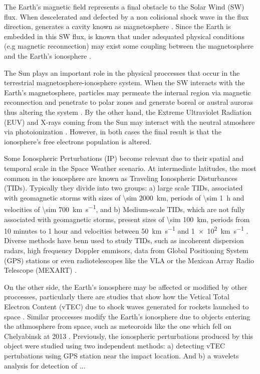 The Earth's magnetic field represents a final obstacle to the Solar Wind (SW) flux. When descelerated and defected by a non colisional shock wave in the flux direction, generates a cavity known as magnetosphere \citep{Blanco-Cano:2004}. Since the Earth is embedded in this SW flux, is known that under adequated physical conditions (e.g magnetic reconnection) may exist some coupling between the magnetosphere and the Earth's ionosphere \citep{Zolesi:2014, Cnossen:2014}.

The Sun plays an important role in the physical proccesses that occur in the terrestrial magnetosphere-ionosphere system. When the SW interacts with the Earth's magnetosphere, particles may permeate the internal region via magnetic reconnection and penetrate to polar zones and generate boreal or austral auroras thus altering the system \citep{Vazquez:2016, Oka:2011}. By the other hand, the Extreme Ultraviolet Radiation (EUV) and X-rays coming from the Sun may interact with the neutral atmoshere via photoionization \citep{Vlasov:2010}. However, in both cases the final result is that the ionosphere's free electrons population is altered.

Some Ionospheric Perturbations (IP) become relevant due to their spatial and temporal scale in the Space Weather scenario. At intermediate latitudes, the most common in the ionosphere are known as Traveling Ionospheric Disturbances (TIDs). Typically they divide into two groups: a) large scale TIDs, associated with geomagnetic storms with sizes of \SI{\sim 2000}{km}, periods of \SI{\sim 1}{h} and velocities of \SI{\sim 700}{km.s^{-1}}, and b) Medium-scale TIDs, which are not fully associated with geomagnetic storms, present sizes of \SI{\sim 100}{km}, periods from 10 minutes to 1 hour and velocities between \SI{50}{km.s^{-1}} and \SI{1e2}{km.s^{-1}} \citep{Helmboldt:2012}. Diverse methods have benn used to study TIDs, such as incoherent dispersion radars, high frequency Doppler emmisors, data from Global Positioning System (GPS) stations or even radiotelescopes like the VLA or the Mexican Array Radio Telescope (MEXART) \citep{Chilcote:2015, Rodriguez:2014}.

On the other side, the Earth's ionosphere may be affected or modified by other proccesses, particularly there are studies that show how the Vetical Total Electron Content (vTEC) due to shock waves generated for rockets launched to space \citep{Lin:2014}. Similar proccesses modify the Earth's ionosphere due to objects entering the athmosphere from space, such as meteoroids like the one which fell on Chelyabinsk at 2013 \citep{Yang:2014}. Previously, the ionospheric perturbations produced by this object were studied using two independent methods: a) detecting vTEC pertubations using GPS station near the impact location. And b) a wavelets analysis for detection of ...

